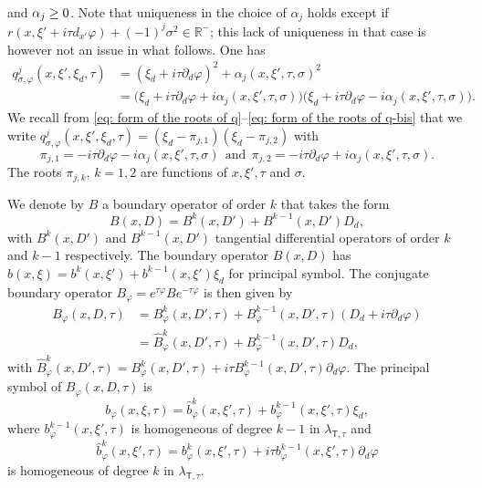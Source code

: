 \documentclass[10pt]{amsart}
\theoremstyle{plain}
\theoremstyle{definition}
\def\R{\mathbb{R}}
\let \Re \relax
\DeclareMathOperator{\Re}{Re}
\newcommand{\lsct}{\lambda_{{\scriptscriptstyle{\mathsf T}},\tau}}
\newcommand{\qconj}{q_{\sigma,\varphi}}
\begin{document}
and $\Re \alpha_j \geq 0$. Note that uniqueness in the choice of
$\alpha_j$ holds except if $r(x, \xi' + i \tau d_{x'}\varphi)
+ (-1)^j \sigma^2 \in \R^-$; this lack of uniqueness in that case is however not an issue
in what follows.
One has
\begin{align*}
\qconj^j(x,\xi',\xi_d,\tau)
&= (\xi_d+i\tau\partial_d\varphi)^2+\alpha_j (x,\xi',\tau,\sigma)^2\\
&=
\big(\xi_d+i\tau\partial_d\varphi+i\alpha_j(x,\xi',\tau,\sigma)\big)%
\big(\xi_d+i\tau\partial_d\varphi-i\alpha_j(x,\xi',\tau,\sigma)\big).
\end{align*}
We recall from \eqref{eq: form of the roots of q}--\eqref{eq: form of the
roots of q-bis} that we write $\qconj^j(x,\xi',\xi_d,\tau)=(\xi_d-\pi_{j,1})(\xi_d-\pi_{j,2})$ with
\begin{equation*}
\pi_{j,1}=-i\tau\partial_d\varphi- i\alpha_j(x,\xi',\tau,\sigma)
\ \ \text{and} \ \
\pi_{j,2} = -i\tau\partial_d\varphi + i\alpha_j(x,\xi',\tau,\sigma).
\end{equation*}
The roots $\pi_{j,k}$, $k=1,2$ are functions of $x,\xi',\tau$ and $\sigma$.

We denote by $B$ a boundary operator of order $k$ that takes
the form
\[
B(x,D)=B^{k}(x,D') + B^{k-1}(x,D')D_d,
\]
with $B^{k}(x,D')$
and $B^{k-1}(x,D')$ tangential differential operators of order $k$ and
$k-1$ respectively. The boundary operator $B(x,D)$ has
$b(x,\xi)=b^k(x,\xi') + b^{k-1}(x,\xi')\xi_d$ for principal
symbol. The conjugate boundary operator
$B_{\varphi}=e^{\tau\varphi}Be^{-\tau\varphi}$ is then given by
\begin{align*}
B_{\varphi}(x,D,\tau) &=B^k_{\varphi}(x, D',\tau)+B^{k-1}_{\varphi}(x,D',\tau)(D_d+i\tau\partial_d\varphi)\\
&=
\hat{B}^k_{\varphi}(x,D',\tau)+
B^{k-1}_{\varphi}(x,D',\tau)D_d,
\end{align*}
with
$\hat{B}^k_{\varphi}(x,D',\tau)
=B^k_{\varphi}(x,D',\tau)+i \tau
B^{k-1}_{\varphi}(x,D',\tau)\partial_d\varphi$.
The principal symbol of $B_{\varphi}(x,D,\tau)$ is
\begin{equation*}
b_\varphi(x,\xi,\tau) = \hat{b}^k_{\varphi}(x,\xi',\tau) + b^{k-1}_{\varphi}(x,\xi',\tau) \xi_d,
\end{equation*}
where $b^{k-1}_{\varphi}(x,\xi',\tau)$ is homogeneous of
degree $k-1$ in $\lsct$ and
\[
\hat{b}^k_{\varphi}(x,\xi',\tau)=b^k_{\varphi}(x,\xi',\tau)+ i \tau
b^{k-1}_{\varphi}(x,\xi',\tau)\partial_d\varphi
\]
is homogeneous of
degree $k$ in $\lsct$.
\end{document}
